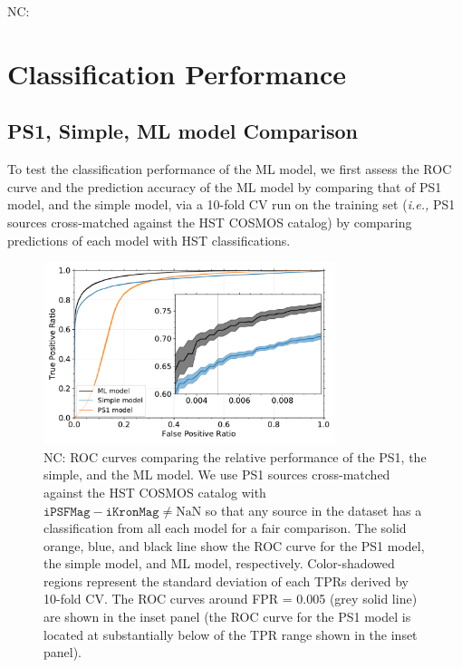 \documentclass[twocolumn]{aastex62}
\newcommand{\NC}[1]{{\color{brown} NC: {#1}}}
\begin{document}
\NC{
\section{Classification Performance}

\subsection{PS1, Simple, ML model Comparison}\label{sec:comp_hst}
To test the classification performance of the ML model, 
we first assess the ROC curve and the prediction accuracy 
of the ML model by comparing that of PS1 model, and the simple model, 
via a 10-fold CV run on the training set ({\it i.e.,} PS1 sources cross-matched against the HST COSMOS catalog) 
by comparing predictions of each model with HST classifications. 
\begin{figure}[t]
 \centering
  \includegraphics[width=3.35in, bb = 0 0 576 360]{./Figures/CV_ROC_HST.pdf}
  \caption{
  \NC{ ROC curves comparing the relative performance of the PS1, the simple, and the ML model. 
  We use PS1 sources cross-matched against the HST COSMOS catalog with 
  $\mathtt{iPSFMag} - \mathtt{iKronMag} \neq \mathrm{NaN}$ 
  so that any source in the dataset has a classification from all each model 
  for a fair comparison. 
  The solid orange, blue, and black line show the ROC curve 
  for the PS1 model, the simple model, and ML model, respectively. 
  Color-shadowed regions represent the standard deviation of each TPRs derived by 10-fold CV. 
  The ROC curves around FPR = 0.005 (grey solid line) are shown in the inset panel 
  (the ROC curve for the PS1 model is located at substantially below of the TPR range shown in the inset panel). 
  }
  }
  \label{fig:cvroc_hst}
\end{figure}

}
\end{document}
